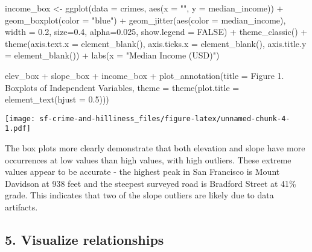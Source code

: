 \documentclass[
]{article}
\newenvironment{Shaded}{\begin{snugshade}}{\end{snugshade}}
\newcommand{\AttributeTok}[1]{\textcolor[rgb]{0.77,0.63,0.00}{#1}}
\newcommand{\ConstantTok}[1]{\textcolor[rgb]{0.00,0.00,0.00}{#1}}
\newcommand{\FloatTok}[1]{\textcolor[rgb]{0.00,0.00,0.81}{#1}}
\newcommand{\FunctionTok}[1]{\textcolor[rgb]{0.00,0.00,0.00}{#1}}
\newcommand{\NormalTok}[1]{#1}
\newcommand{\OtherTok}[1]{\textcolor[rgb]{0.56,0.35,0.01}{#1}}
\newcommand{\SpecialCharTok}[1]{\textcolor[rgb]{0.00,0.00,0.00}{#1}}
\newcommand{\StringTok}[1]{\textcolor[rgb]{0.31,0.60,0.02}{#1}}
\begin{document}
\begin{Shaded}
\begin{Highlighting}[]
\NormalTok{income\_box }\OtherTok{\textless{}{-}} \FunctionTok{ggplot}\NormalTok{(}\AttributeTok{data =}\NormalTok{ crimes, }\FunctionTok{aes}\NormalTok{(}\AttributeTok{x =} \StringTok{""}\NormalTok{, }\AttributeTok{y =}\NormalTok{ median\_income)) }\SpecialCharTok{+}
  \FunctionTok{geom\_boxplot}\NormalTok{(}\AttributeTok{color =} \StringTok{"blue"}\NormalTok{) }\SpecialCharTok{+}
  \FunctionTok{geom\_jitter}\NormalTok{(}\FunctionTok{aes}\NormalTok{(}\AttributeTok{color =}\NormalTok{ median\_income), }
              \AttributeTok{width =} \FloatTok{0.2}\NormalTok{,}
              \AttributeTok{size=}\FloatTok{0.4}\NormalTok{, }
              \AttributeTok{alpha=}\FloatTok{0.025}\NormalTok{, }
              \AttributeTok{show.legend =} \ConstantTok{FALSE}\NormalTok{) }\SpecialCharTok{+}
  \FunctionTok{theme\_classic}\NormalTok{() }\SpecialCharTok{+}
  \FunctionTok{theme}\NormalTok{(}\AttributeTok{axis.text.x =} \FunctionTok{element\_blank}\NormalTok{(),}
        \AttributeTok{axis.ticks.x =} \FunctionTok{element\_blank}\NormalTok{(),}
        \AttributeTok{axis.title.y =} \FunctionTok{element\_blank}\NormalTok{()) }\SpecialCharTok{+}
  \FunctionTok{labs}\NormalTok{(}\AttributeTok{x =} \StringTok{"Median Income (USD)"}\NormalTok{)}

\NormalTok{elev\_box }\SpecialCharTok{+}\NormalTok{ slope\_box }\SpecialCharTok{+}\NormalTok{ income\_box }\SpecialCharTok{+} \FunctionTok{plot\_annotation}\NormalTok{(}\AttributeTok{title =} \StringTok{\textquotesingle{}Figure 1. Boxplots of Independent Variables\textquotesingle{}}\NormalTok{,}
                                                    \AttributeTok{theme =} \FunctionTok{theme}\NormalTok{(}\AttributeTok{plot.title =} \FunctionTok{element\_text}\NormalTok{(}\AttributeTok{hjust =} \FloatTok{0.5}\NormalTok{)))}
\end{Highlighting}
\end{Shaded}

\texttt{[image: sf-crime-and-hilliness\_files/figure-latex/unnamed-chunk-4-1.pdf]}

The box plots more clearly demonstrate that both elevation and slope
have more occurrences at low values than high values, with high
outliers. These extreme values appear to be accurate - the highest peak
in San Francisco is Mount Davidson at 938 feet and the steepest surveyed
road is Bradford Street at 41\% grade. This indicates that two of the
slope outliers are likely due to data artifacts.

\hypertarget{visualize-relationships}{%
\subsection{5. Visualize relationships}\label{visualize-relationships}}
\end{document}
